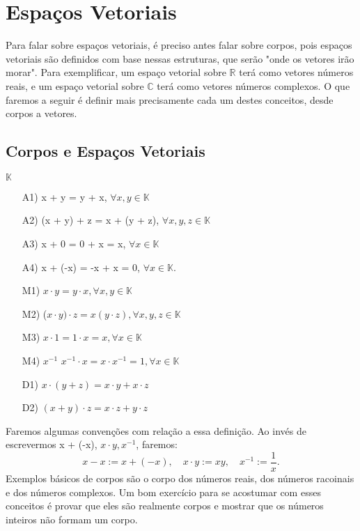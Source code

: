 \section{Espa\c cos Vetoriais}
Para falar sobre espa\c cos vetoriais, \'e preciso antes falar sobre corpos, pois espa\c cos
vetoriais s\~ao definidos com base nessas estruturas, que ser\~ao "onde os vetores ir\~ao morar".
Para exemplificar, um espa\c co vetorial sobre $\mathbb{R}$ ter\'a como vetores n\'umeros reais,
e um espa\c co vetorial sobre $\mathbb{C}$ ter\'a como vetores n\'umeros complexos. O que 
faremos a seguir \'e definir mais precisamente cada um destes conceitos, desde corpos a vetores.
\subsection{Corpos e Espa\c cos Vetoriais}
\begin{def*}
     $\mathbb{K}$ 
    \begin{itemize}
        \item [A1)] x + y = y + x, $\forall x, y\in\mathbb{K}$
        \item [A2)] (x + y) + z = x + (y + z), $\forall x, y, z\in\mathbb{K}$
        \item [A3)]  x + 0 = 0 + x = x, $\forall x \in\mathbb{K}$
        \item [A4)]  x + (-x) = -x + x = 0, $\forall x \in\mathbb{K}$. 
        \item [M1)] $x\cdot{}y = y\cdot{}x, \forall x, y\in\mathbb{K}$
        \item [M2)] ($x\cdot{y})\cdot{z} = x(y\cdot{z}), \forall x, y, z \in\mathbb{K}$
        \item [M3)]  $x\cdot{1} = 1\cdot{x} = x, \forall x \in\mathbb{K}$
        \item [M4)]  $x^{-1}$  $x^{-1}\cdot{}x = x\cdot{x^{-1}} = 1, \forall x \in\mathbb{K}$
        \item [D1)] $x\cdot{}(y + z) = x\cdot{y} + x\cdot{z}$
        \item [D2)] $(x + y)\cdot{}z = x\cdot{z} + y\cdot{z}$
    \end{itemize}
\end{def*}
Faremos algumas conven\c c\~oes com rela\c c\~ao a essa defini\c c\~ao. Ao inv\'es de escrevermos x + (-x), $x\cdot{y}, x^{-1}$, faremos:
$$
    x - x := x + (-x), \quad x\cdot{y} := xy, \quad x^{-1} := \frac{1}{x}.
$$
Exemplos b\'asicos de corpos s\~ao o corpo dos n\'umeros reais, dos n\'umeros racoinais e dos n\'umeros complexos. 
Um bom exerc\'icio para se acostumar com esses conceitos \'e provar que eles s\~ao realmente corpos e mostrar que
os n\'umeros inteiros n\~ao formam um corpo. 

